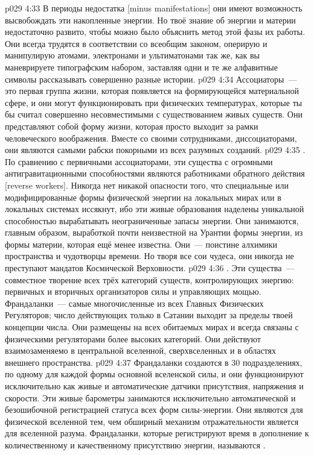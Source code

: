 \vs p029 4:33 В периоды недостатка [minus manifestations] они имеют возможность высвобождать эти накопленные энергии. Но твоё знание об энергии и материи недостаточно развито, чтобы можно было объяснить метод этой фазы их работы. Они всегда трудятся в соответствии со всеобщим законом, оперирую и манипулирую атомами, электронами и ультиматонами так же, как вы маневрируете типографским набором, заставляя одни и те же алфавитные символы рассказывать совершенно разные истории.
\vs p029 4:34 Ассоциаторы~--- это первая группа жизни, которая появляется на формирующейся материальной сфере, и они могут функционировать при физических температурах, которые ты бы считал совершенно несовместимыми с существованием живых существ. Они представляют собой форму жизни, которая просто выходит за рамки человеческого воображения. Вместе со своими сотрудниками, диссоциаторами, они являются самыми рабски покорными из всех разумных созданий.
\vs p029 4:35 . По сравнению с первичными ассоциаторами, эти существа с огромными антигравитационными способностями являются работниками обратного действия [reverse workers]. Никогда нет никакой опасности того, что специальные или модифицированные формы физической энергии на локальных мирах или в локальных системах иссякнут, ибо эти живые образования наделены уникальной способностью вырабатывать неограниченные запасы энергии. Они занимаются, главным образом, выработкой почти неизвестной на Урантии формы энергии, из формы материи, которая ещё менее известна. Они~--- поистине алхимики пространства и чудотворцы времени. Но творя все сои чудеса, они никогда не преступают мандатов Космической Верховности.
\vs p029 4:36 . Эти существа~--- совместное творение всех трёх категорий существ, контролирующих энергию: первичных и вторичных организаторов силы и управляющих мощью. Франдаланки~--- самые многочисленные из всех Главных Физических Регуляторов; число действующих только в Сатании выходит за пределы твоей концепции числа. Они размещены на всех обитаемых мирах и всегда связаны с физическими регуляторами более высоких категорий. Они действуют взаимозаменяемо в центральной вселенной, сверхвселенных и в областях внешнего пространства.
\vs p029 4:37 Франдаланки создаются в 30 подразделениях, по одному для каждой формы основной вселенской силы, и они функционируют исключительно как живые и автоматические датчики присутствия, напряжения и скорости. Эти живые барометры занимаются исключительно автоматической и безошибочной регистрацией статуса всех форм силы\hyp{}энергии. Они являются для физической вселенной тем, чем обширный механизм отражательности является для вселенной разума. Франдаланки, которые регистрируют время в дополнение к количественному и качественному присутствию энергии, называются .
